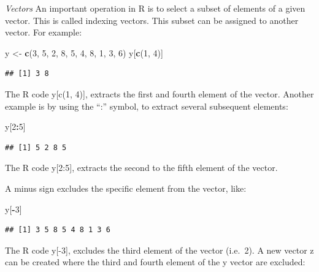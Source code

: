 \documentclass[]{book}
\newenvironment{Shaded}{\begin{snugshade}}{\end{snugshade}}
\newcommand{\KeywordTok}[1]{\textcolor[rgb]{0.13,0.29,0.53}{\textbf{#1}}}
\newcommand{\DecValTok}[1]{\textcolor[rgb]{0.00,0.00,0.81}{#1}}
\newcommand{\StringTok}[1]{\textcolor[rgb]{0.31,0.60,0.02}{#1}}
\newcommand{\OperatorTok}[1]{\textcolor[rgb]{0.81,0.36,0.00}{\textbf{#1}}}
\newcommand{\NormalTok}[1]{#1}
\theoremstyle{definition}
\theoremstyle{definition}
\theoremstyle{definition}
\theoremstyle{remark}
\begin{document}
\emph{Vectors} An important operation in R is to select a subset of
elements of a given vector. This is called indexing vectors. This subset
can be assigned to another vector. For example:

\begin{Shaded}
\begin{Highlighting}[]
\NormalTok{y <-}\StringTok{ }\KeywordTok{c}\NormalTok{(}\DecValTok{3}\NormalTok{, }\DecValTok{5}\NormalTok{, }\DecValTok{2}\NormalTok{, }\DecValTok{8}\NormalTok{, }\DecValTok{5}\NormalTok{, }\DecValTok{4}\NormalTok{, }\DecValTok{8}\NormalTok{, }\DecValTok{1}\NormalTok{, }\DecValTok{3}\NormalTok{, }\DecValTok{6}\NormalTok{)}
\NormalTok{y[}\KeywordTok{c}\NormalTok{(}\DecValTok{1}\NormalTok{, }\DecValTok{4}\NormalTok{)]}
\end{Highlighting}
\end{Shaded}

\begin{verbatim}
## [1] 3 8
\end{verbatim}

The R code y{[}c(1, 4){]}, extracts the first and fourth element of the
vector. Another example is by using the ``:'' symbol, to extract several
subsequent elements:

\begin{Shaded}
\begin{Highlighting}[]
\NormalTok{y[}\DecValTok{2}\OperatorTok{:}\DecValTok{5}\NormalTok{]}
\end{Highlighting}
\end{Shaded}

\begin{verbatim}
## [1] 5 2 8 5
\end{verbatim}

The R code y{[}2:5{]}, extracts the second to the fifth element of the
vector.

A minus sign excludes the specific element from the vector, like:

\begin{Shaded}
\begin{Highlighting}[]
\NormalTok{y[}\OperatorTok{-}\DecValTok{3}\NormalTok{]}
\end{Highlighting}
\end{Shaded}

\begin{verbatim}
## [1] 3 5 8 5 4 8 1 3 6
\end{verbatim}

The R code y{[}-3{]}, excludes the third element of the vector (i.e.~2).
A new vector z can be created where the third and fourth element of the
y vector are excluded:
\end{document}
